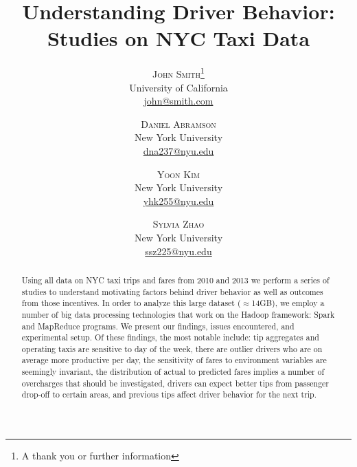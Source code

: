 \documentclass[twoside]{article}
\title{\vspace{-15mm}\fontsize{24pt}{10pt}\selectfont\textbf{Understanding Driver Behavior: Studies on NYC Taxi Data}} %
\author{
\large
\textsc{John Smith}\thanks{A thank you or further information}\\[2mm] %
\normalsize University of California \\ %
\normalsize \href{mailto:john@smith.com}{john@smith.com} %
\vspace{-5mm}
}
\author{
\large
\textsc{Daniel Abramson}\\[2mm] %
\normalsize New York University \\ %
\normalsize \href{mailto:dna237@nyu.edu}{dna237@nyu.edu} %
\vspace{-5mm}
\and
\textsc{Yoon Kim}\\[2mm] %
\normalsize New York University \\ %
\normalsize \href{mailto:yhk255@nyu.edu}{yhk255@nyu.edu} %
\vspace{-5mm}
\and
\textsc{Sylvia Zhao}\\[2mm] %
\normalsize New York University \\ %
\normalsize \href{mailto:ssz225@nyu.edu}{ssz225@nyu.edu} %
\vspace{-5mm}
}
\date{}
\begin{document}
\maketitle %

\thispagestyle{fancy} %

\begin{abstract}
\noindent Using all data on NYC taxi trips and fares from 2010 and 2013 we perform a series of studies to understand motivating factors behind driver behavior as well as outcomes from those incentives. In order to analyze this large dataset ($\approx$14GB), we employ a number of big data processing technologies that work on the Hadoop framework: Spark and MapReduce programs.  We present our findings, issues encountered, and experimental setup. Of these findings, the most notable include: tip aggregates and operating taxis are sensitive to day of the week, there are outlier drivers who are on average more productive per day, the sensitivity of fares to environment variables are seemingly invariant, the distribution of actual to predicted fares implies a number of overcharges that should be investigated, drivers can expect better tips from passenger drop-off to certain areas, and previous tips affect driver behavior for the next trip. 

\end{abstract}

\end{document}
